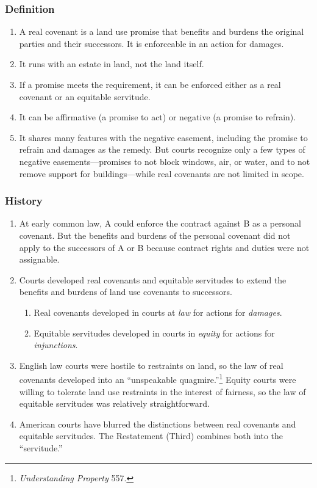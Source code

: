 \subsubsection{Definition}

\begin{enumerate}
    \item A real covenant is a land use promise that benefits and burdens the 
    original parties and their successors. It is enforceable in an action for 
    damages.
    \item It runs with an estate in land, not the land itself.
    \item If a promise meets the requirement, it can be enforced either as a 
    real covenant or an equitable servitude.
    \item It can be affirmative (a promise to act) or negative (a promise to 
    refrain).
    \item It shares many features with the negative easement, including the 
    promise to refrain and damages as the remedy. But courts recognize only a 
    few types of negative easements---promises to not block windows, air, or 
    water, and to not remove support for buildings---while real covenants are 
    not limited in scope.
\end{enumerate}

\subsubsection{History}

\begin{enumerate}
    \item At early common law, A could enforce the contract against B as a 
    personal covenant. But the benefits and burdens of the personal covenant 
    did not apply to the successors of A or B because contract rights and 
    duties were not assignable.
    \item Courts developed real covenants and equitable servitudes to extend 
    the benefits and burdens of land use covenants to successors.
    \begin{enumerate}
        \item Real covenants developed in courts at \emph{law} for actions for 
        \emph{damages}.
        \item Equitable servitudes developed in courts in \emph{equity} for 
        actions for \emph{injunctions}.
    \end{enumerate}
    \item English law courts were hostile to restraints on land, so the law of 
    real covenants developed into an ``unspeakable 
    quagmire.''\footnote{\emph{Understanding Property} 557.} Equity courts 
    were willing to tolerate land use restraints in the interest of fairness, 
    so the law of equitable servitudes was relatively straightforward.
    \item American courts have blurred the distinctions between real covenants 
    and equitable servitudes. The Restatement (Third) combines both into the 
    ``servitude.''
\end{enumerate}

